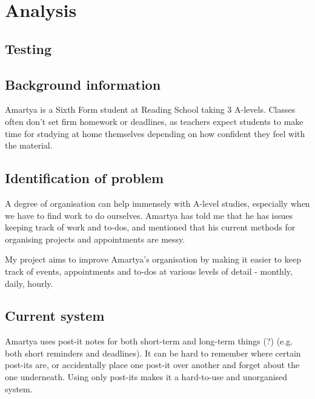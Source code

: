 \section{Analysis}

\subsection{Testing}

\makeatletter

\meaning\markboth

\meaning\leftmark

\meaning\@leftmark

\meaning\rightmark

\meaning\@rightmark

\meaning\sectionmark

\thesection

\makeatother


\subsection{Background information}

Amartya is a Sixth Form student at Reading School taking 3 A-levels. Classes
often don't set firm homework or deadlines, as teachers expect students to make
time for studying at home themselves depending on how confident they feel with
the material.


\subsection{Identification of problem}

A degree of organisation can help immensely with A-level studies, especially
when we have to find work to do ourselves. Amartya has told me that he has
issues keeping track of work and to-dos, and mentioned that his current methods
for organising projects and appointments are messy.

My project aims to improve Amartya's organisation by making it easier to keep
track of events, appointments and to-dos at various levels of detail - monthly,
daily, hourly.


\subsection{Current system}

Amartya uses post-it notes for both short-term and long-term things (?) (e.g.
both short reminders and deadlines). It can be hard to remember where certain
post-its are, or accidentally place one post-it over another and forget about
the one underneath. Using only post-its makes it a hard-to-use and unorganised
system.


